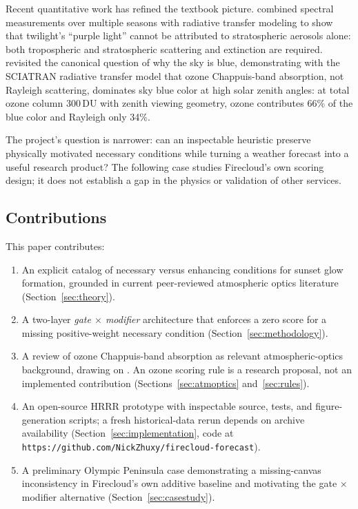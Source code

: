 \documentclass[11pt,a4paper]{article}
\begin{document}
Recent quantitative work has refined the textbook picture. \citet{lee2003purple} combined spectral measurements over multiple seasons with radiative transfer modeling to show that twilight's ``purple light'' cannot be attributed to stratospheric aerosols alone: both tropospheric and stratospheric scattering and extinction are required. \citet{lange2023revisiting} revisited the canonical question of why the sky is blue, demonstrating with the SCIATRAN radiative transfer model that ozone Chappuis-band absorption, not Rayleigh scattering, dominates sky blue color at high solar zenith angles: at total ozone column 300\,DU with zenith viewing geometry, ozone contributes 66\% of the blue color and Rayleigh only 34\%.

The project's question is narrower: can an inspectable heuristic preserve physically motivated necessary conditions while turning a weather forecast into a useful research product? The following case studies Firecloud's own scoring design; it does not establish a gap in the physics or validation of other services.

\subsection{Contributions}

This paper contributes:
\begin{enumerate}
\item An explicit catalog of necessary versus enhancing conditions for sunset glow formation, grounded in current peer-reviewed atmospheric optics literature (Section~\ref{sec:theory}).
\item A two-layer \emph{gate $\times$ modifier} architecture that enforces a zero score for a missing positive-weight necessary condition (Section~\ref{sec:methodology}).
\item A review of ozone Chappuis-band absorption as relevant atmospheric-optics background, drawing on \citet{lange2023revisiting}. An ozone scoring rule is a research proposal, not an implemented contribution (Sections~\ref{sec:atmoptics} and~\ref{sec:rules}).
\item An open-source HRRR prototype with inspectable source, tests, and figure-generation scripts; a fresh historical-data rerun depends on archive availability (Section~\ref{sec:implementation}, code at \texttt{https://github.com/NickZhuxy/firecloud-forecast}).
\item A preliminary Olympic Peninsula case demonstrating a missing-canvas inconsistency in Firecloud's own additive baseline and motivating the gate $\times$ modifier alternative (Section~\ref{sec:casestudy}).
\end{enumerate}
\end{document}
